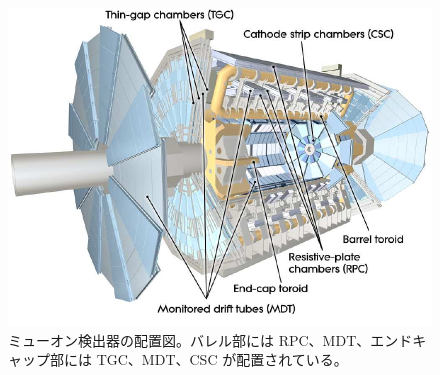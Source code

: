 \begin{figure}[tb]
  \centering
  \includegraphics[clip, width=12cm]{fig/2/muondetector.pdf}
  \caption{ミューオン検出器の配置図\cite{Aad:1129811}。バレル部には RPC、MDT、エンドキャップ部には TGC、MDT、CSC が配置されている。}
  \label{fig:ミューオン検出器}
\end{figure}

